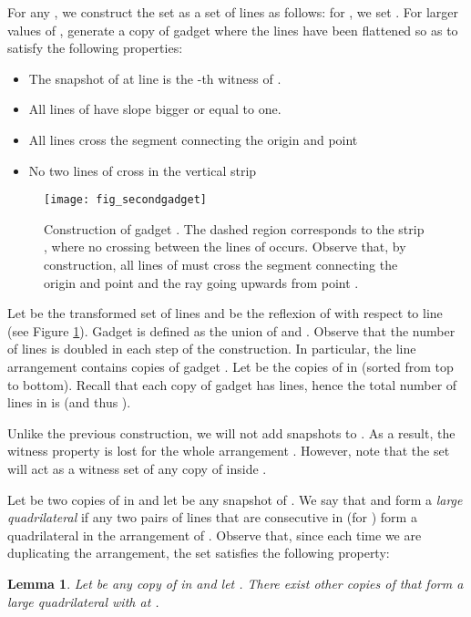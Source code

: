 \documentclass[11pt,a4paper]{article}
\newtheorem{lemma}[theorem]{Lemma}
\begin{document}
For any , we construct the set  as a set of  lines as follows: for , we set . For larger values of , generate a copy of gadget  where the lines have been flattened so as to satisfy the following properties:
\begin{itemize}
\item The snapshot of  at line  is the -th witness of .
\item All lines of  have slope bigger or equal to one.
\item All lines cross the segment connecting the origin and point 
\item No two lines of  cross in the vertical strip 
\end{itemize}
\begin{figure}
   \begin{center}
     \texttt{[image: fig\_secondgadget]}
     \caption{Construction of gadget . The dashed region corresponds to the strip , where no crossing between the lines of  occurs. Observe that, by construction, all lines of  must cross the segment connecting the origin and point  and the ray going upwards from point .}
     \label{Afig_secondgadget}
   \end{center}
\end{figure}

Let  be the transformed set of lines and  be the reflexion of  with respect to line  (see Figure \ref{Afig_secondgadget}). Gadget  is defined as the union of  and . Observe that the number of lines is doubled in each step of the construction. In particular,  the line arrangement  contains  copies of gadget . Let  be the copies of  in  (sorted from top to bottom). Recall that each copy of gadget  has  lines, hence the total number of lines in  is  (and thus ).

Unlike the previous construction, we will not add snapshots to . As a result, the witness property is lost for the whole arrangement . However, note that the set  will act as a witness set of any copy of  inside .

Let  be two copies of  in  and let  be any snapshot of . We say that  and  form a {\em large quadrilateral} if any two pairs of lines  that are consecutive in  (for ) form a quadrilateral in the arrangement of . Observe that, since each time we are duplicating the arrangement, the set  satisfies the following property:

\begin{lemma}\label{Alem_charac}
Let  be any copy of  in  and let . There exist  other copies of  that form a large quadrilateral with  at .
\end{lemma}
\end{document}
